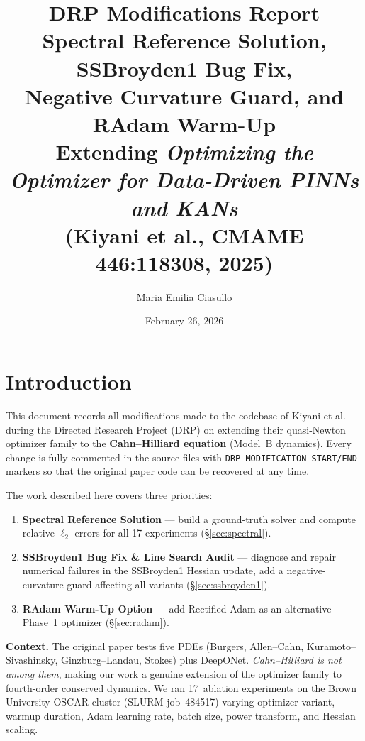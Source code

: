 \documentclass[11pt,a4paper]{article}
\title{%
  \textbf{DRP Modifications Report}\\[6pt]
  \large Spectral Reference Solution, SSBroyden1 Bug Fix,\\
  Negative Curvature Guard, and RAdam Warm-Up\\[6pt]
  \normalsize Extending \emph{Optimizing the Optimizer for Data-Driven PINNs and KANs}\\
  (Kiyani et al., CMAME \textbf{446}:118308, 2025)
}
\author{Maria Emilia Ciasullo}
\date{February 26, 2026}
\begin{document}
\maketitle
\tableofcontents
\newpage

\section{Introduction}
\label{sec:intro}

This document records all modifications made to the codebase of
Kiyani et al.\ \cite{kiyani2025} during the Directed Research Project
(DRP) on extending their quasi-Newton optimizer family to the
\textbf{Cahn--Hilliard equation} (Model~B dynamics).  Every change is
fully commented in the source files with \texttt{DRP MODIFICATION
START/END} markers so that the original paper code can be recovered at
any time.

The work described here covers three priorities:

\begin{enumerate}[label=\textbf{P\arabic*}]
  \item \textbf{Spectral Reference Solution} --- build a ground-truth
        solver and compute relative $\ell_2$ errors for all 17
        experiments (\S\ref{sec:spectral}).
  \item \textbf{SSBroyden1 Bug Fix \& Line Search Audit} --- diagnose
        and repair numerical failures in the SSBroyden1 Hessian update,
        add a negative-curvature guard affecting all variants
        (\S\ref{sec:ssbroyden1}).
  \item \textbf{RAdam Warm-Up Option} --- add Rectified Adam as an
        alternative Phase~1 optimizer (\S\ref{sec:radam}).
\end{enumerate}

\medskip
\noindent
\textbf{Context.}  The original paper \cite{kiyani2025} tests five PDEs
(Burgers, Allen--Cahn, Kuramoto--Sivashinsky, Ginzburg--Landau, Stokes)
plus DeepONet.  \emph{Cahn--Hilliard is not among them}, making our
work a genuine extension of the optimizer family to fourth-order
conserved dynamics.  We ran 17~ablation experiments on the Brown
University OSCAR cluster (SLURM job~484517) varying optimizer variant,
warmup duration, Adam learning rate, batch size, power transform, and
Hessian scaling.


\end{document}
